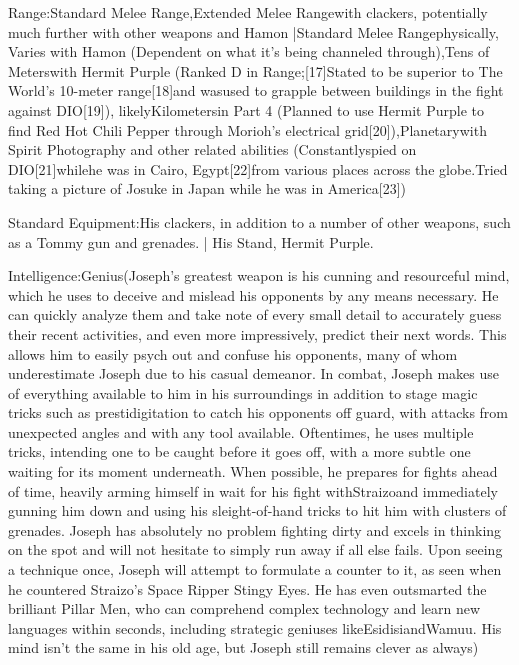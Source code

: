 \documentclass[a4paper,12pt]{article}
\begin{document}
Range:Standard Melee Range,Extended Melee Rangewith clackers, potentially much further with other weapons and Hamon |Standard Melee Rangephysically, Varies with Hamon (Dependent on what it's being channeled through),Tens of Meterswith Hermit Purple (Ranked D in Range;[17]Stated to be superior to The World's 10-meter range[18]and wasused to grapple between buildings in the fight against DIO[19]), likelyKilometersin Part 4 (Planned to use Hermit Purple to find Red Hot Chili Pepper through Morioh's electrical grid[20]),Planetarywith Spirit Photography and other related abilities (Constantlyspied on DIO[21]whilehe was in Cairo, Egypt[22]from various places across the globe.Tried taking a picture of Josuke in Japan while he was in America[23])\\ \par \vspace{0.5cm}

Standard Equipment:His clackers, in addition to a number of other weapons, such as a Tommy gun and grenades. | His Stand, Hermit Purple.\\ \par \vspace{0.5cm}

Intelligence:Genius(Joseph's greatest weapon is his cunning and resourceful mind, which he uses to deceive and mislead his opponents by any means necessary. He can quickly analyze them and take note of every small detail to accurately guess their recent activities, and even more impressively, predict their next words. This allows him to easily psych out and confuse his opponents, many of whom underestimate Joseph due to his casual demeanor. In combat, Joseph makes use of everything available to him in his surroundings in addition to stage magic tricks such as prestidigitation to catch his opponents off guard, with attacks from unexpected angles and with any tool available. Oftentimes, he uses multiple tricks, intending one to be caught before it goes off, with a more subtle one waiting for its moment underneath. When possible, he prepares for fights ahead of time, heavily arming himself in wait for his fight withStraizoand immediately gunning him down and using his sleight-of-hand tricks to hit him with clusters of grenades. Joseph has absolutely no problem fighting dirty and excels in thinking on the spot and will not hesitate to simply run away if all else fails. Upon seeing a technique once, Joseph will attempt to formulate a counter to it, as seen when he countered Straizo's Space Ripper Stingy Eyes. He has even outsmarted the brilliant Pillar Men, who can comprehend complex technology and learn new languages within seconds, including strategic geniuses likeEsidisiandWamuu. His mind isn't the same in his old age, but Joseph still remains clever as always)\\ \par \vspace{0.5cm}
\end{document}
